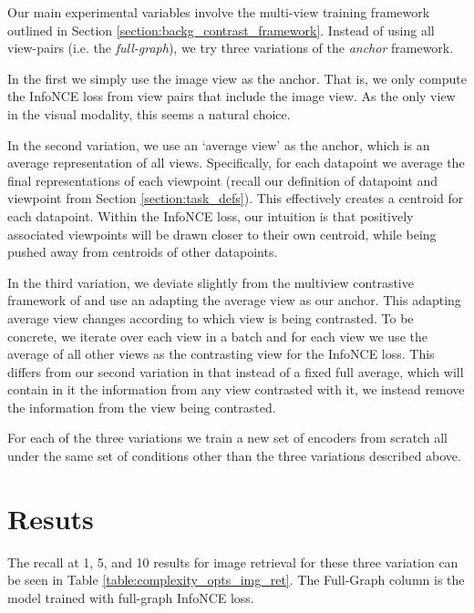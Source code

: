 Our main experimental variables involve the multi-view training framework outlined in Section \ref{section:backg_contrast_framework}.
Instead of using all view-pairs (i.e. the \textit{full-graph}), we try three variations of the \textit{anchor} framework.

In the first we simply use the image view as the anchor.
That is, we only compute the InfoNCE loss from view pairs that include the image view.
As the only view in the visual modality, this seems a natural choice.

In the second variation, we use an `average view' as the anchor, which is an average representation of all views.
Specifically, for each datapoint we average the final representations of each viewpoint (recall our definition of datapoint and viewpoint from Section \ref{section:task_defs}).
This effectively creates a centroid for each datapoint. %
Within the InfoNCE loss, our intuition is that positively associated viewpoints will be drawn closer to their own centroid, while being pushed away from centroids of other datapoints.

In the third variation, we deviate slightly from the multiview contrastive framework of \citeme and use an adapting the average view as our anchor.
This adapting average view changes according to which view is being contrasted.
To be concrete, we iterate over each view in a batch and for each view we use the average of all other views as the contrasting view for the InfoNCE loss.
This differs from our second variation in that instead of a fixed full average, which will contain in it the information from any view contrasted with it, we instead remove the information from the view being contrasted.

For each of the three variations we train a new set of encoders from scratch all under the same set of conditions other than the three variations described above.

\section{Resuts}
\label{section:loss_comp_results}
The recall at 1, 5, and 10 results for image retrieval for these three variation can be seen in Table \ref{table:complexity_opts_img_ret}.
The Full-Graph column is the model trained with full-graph InfoNCE loss.


